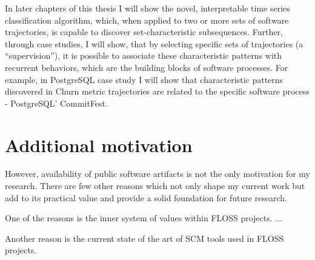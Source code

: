 In later chapters of this thesis I will show the novel, interpretable time series classification algorithm, which,
when applied to two or more sets of software trajectories, is capable to discover set-characteristic subsequences.
Further, through case studies, I will show, that by selecting specific sets of trajectories (a ``supervision''),
it is possible to associate these characteristic patterns with recurrent behaviors, which are the building blocks of 
software processes. For example, in PostgreSQL case study I will show that characteristic patterns discovered 
in Churn metric trajectories are related to the specific software process - PostgreSQL' CommitFest.



\section{Additional motivation}\label{motivation}
However, availability of public software artifacts is not the only motivation for my research. There are few other
reasons which not only shape my current work but add to its practical value and provide a solid foundation for 
future research.

One of the reasons is the inner system of values within FLOSS projects. ...

Another reason is the current state of the art of SCM tools used in FLOSS projects.



